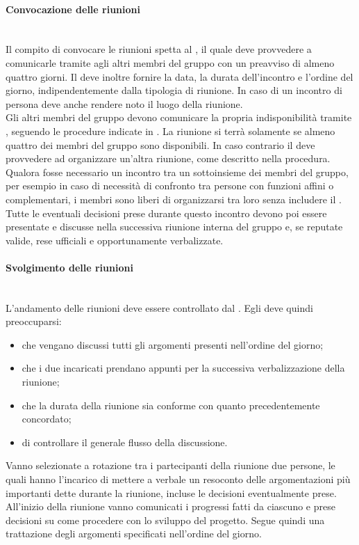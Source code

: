\paragraph{Convocazione delle riunioni}\mbox{}\\
Il compito di convocare le riunioni spetta al \Responsabile, il quale deve provvedere a comunicarle tramite  agli altri membri del gruppo con un preavviso di almeno quattro giorni. Il \Responsabile{} deve inoltre fornire la data, la durata dell'incontro e l'ordine del giorno, indipendentemente dalla tipologia di riunione. In caso di un incontro di persona deve anche rendere noto il luogo della riunione.\\
Gli altri membri del gruppo devono comunicare la propria indisponibilità tramite , seguendo le procedure indicate in . La riunione si terrà solamente se almeno quattro dei membri del gruppo sono disponibili. In caso contrario il \Responsabile{} deve provvedere ad organizzare un'altra riunione, come descritto nella procedura.\\
Qualora fosse necessario un incontro tra un sottoinsieme dei membri del gruppo, per esempio in caso di necessità di confronto tra persone con funzioni affini o complementari, i membri sono liberi di organizzarsi tra loro senza includere il \Responsabile. Tutte le eventuali decisioni prese durante questo incontro devono poi essere presentate e discusse nella successiva riunione interna del gruppo e, se reputate valide, rese ufficiali e opportunamente verbalizzate.

\paragraph{Svolgimento delle riunioni}\label{sec:svolgimento_riunioni_interne} \mbox{}\\
L'andamento delle riunioni deve essere controllato dal \Responsabile. Egli deve quindi preoccuparsi:

\begin{itemize}
	\item che vengano discussi tutti gli argomenti presenti nell'ordine del giorno;
	\item che i due incaricati prendano appunti per la successiva verbalizzazione della riunione;
	\item che la durata della riunione sia conforme con quanto precedentemente concordato;
	\item di controllare il generale flusso della discussione.
\end{itemize}
Vanno selezionate a rotazione tra i partecipanti della riunione due persone, le quali hanno l'incarico di mettere a verbale un resoconto delle argomentazioni più importanti dette durante la riunione, incluse le decisioni eventualmente prese. All'inizio della riunione vanno comunicati i progressi fatti da ciascuno e prese decisioni su come procedere con lo sviluppo del progetto. Segue quindi una trattazione degli argomenti specificati nell'ordine del giorno. 

